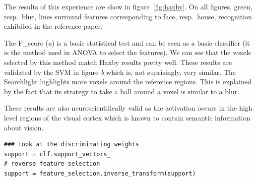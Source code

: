 \documentclass{frontiersSCNS} %
\begin{document}
The results of this experience are show in figure~\ref{fig:haxby}.
On all figures, green, resp.\ blue,
lines surround features corresponding to face, resp.\ house, recognition
exhibited in the reference paper.

The F\_score (\textit{a}) is a basic statistical test and can be seen as a basic
classifier (it is the method used in ANOVA to select the features).
We can see that the voxels selected by this method match
Haxby results pretty well. These results are validated by the SVM in figure
\textit{b} which is, not suprisingly, very similar.
The Searchlight highlights more voxels around the reference regions. This is
explained by the fact that its strategy to take a ball around a voxel
is similar to a blur.

These results are also neuroscientifically valid as the activation occurs in the
high level regions of the visual cortex which is known to contain semantic
information about vision.

\begin{lstlisting}
### Look at the discriminating weights
support = clf.support_vectors_
# reverse feature selection
support = feature_selection.inverse_transform(support)
\end{lstlisting}
\end{document}
